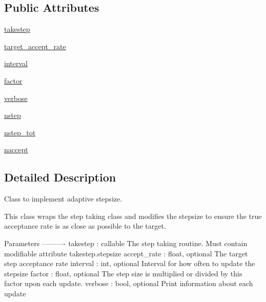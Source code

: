 \subsection*{Public Attributes}
\begin{DoxyCompactItemize}
\item 
\hyperlink{classscipy_1_1optimize_1_1__basinhopping_1_1AdaptiveStepsize_aa93c7f3a433bccfed715417c04e45795}{takestep}
\item 
\hyperlink{classscipy_1_1optimize_1_1__basinhopping_1_1AdaptiveStepsize_a742a08f538bcb508524c9fd2ec9db748}{target\+\_\+accept\+\_\+rate}
\item 
\hyperlink{classscipy_1_1optimize_1_1__basinhopping_1_1AdaptiveStepsize_a906e6efbace1f093c26bb0227f508fcf}{interval}
\item 
\hyperlink{classscipy_1_1optimize_1_1__basinhopping_1_1AdaptiveStepsize_a96f4d2eb19f90d7da9957a1703502f36}{factor}
\item 
\hyperlink{classscipy_1_1optimize_1_1__basinhopping_1_1AdaptiveStepsize_a0fc1833897f80294d6b78e82177f286b}{verbose}
\item 
\hyperlink{classscipy_1_1optimize_1_1__basinhopping_1_1AdaptiveStepsize_a86bea5a74e929dddd6598c4ac1587db1}{nstep}
\item 
\hyperlink{classscipy_1_1optimize_1_1__basinhopping_1_1AdaptiveStepsize_a6437d4838cf2b1a2904ebe8bc4d690fb}{nstep\+\_\+tot}
\item 
\hyperlink{classscipy_1_1optimize_1_1__basinhopping_1_1AdaptiveStepsize_a3fa7443a3c5a078d230aaaa49abad0f8}{naccept}
\end{DoxyCompactItemize}


\subsection{Detailed Description}
\begin{DoxyVerb}Class to implement adaptive stepsize.

This class wraps the step taking class and modifies the stepsize to
ensure the true acceptance rate is as close as possible to the target.

Parameters
----------
takestep : callable
    The step taking routine.  Must contain modifiable attribute
    takestep.stepsize
accept_rate : float, optional
    The target step acceptance rate
interval : int, optional
    Interval for how often to update the stepsize
factor : float, optional
    The step size is multiplied or divided by this factor upon each
    update.
verbose : bool, optional
    Print information about each update\end{DoxyVerb}
 

